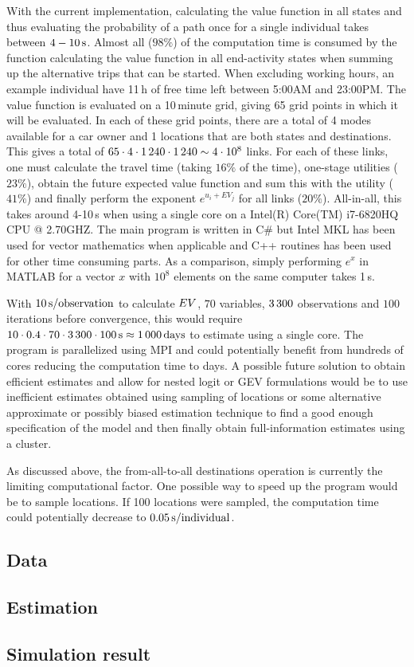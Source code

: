 With the current implementation, calculating the value function in all states and thus evaluating the probability of a path once for a single individual takes between $4-10\, \mathrm{s}$. Almost all ($98\%$) of the computation time is consumed by the function calculating the value function in all end-activity states when summing up the alternative trips that can be started. When excluding working hours, an example individual have 11\,h of free time left between 5:00AM and 23:00PM. The value function is evaluated on a 10\,minute grid, giving 65 grid points in which it will be evaluated. In each of these grid points, there are a total of 4 modes available for a car owner and 1 locations that are both states and destinations. This gives a total of $65 \cdot 4 \cdot 1\, 240 \cdot 1\, 240 \sim 4 \cdot 10^8$ links. For each of these links, one must calculate the travel time (taking $16\%$ of the time), one-stage utilities ($23\%$), obtain the future expected value function and sum this with the utility ($41\%$) and finally perform the exponent $e^{u_i + EV_j}$ for all links ($20\%$). All-in-all, this takes around 4-10\,s when using a single core on a Intel(R) Core(TM) i7-6820HQ CPU @ 2.70GHZ. The main program is written in C\# but Intel MKL has been used for vector mathematics when applicable and C++ routines has been used for other time consuming parts. As a comparison, simply performing $e^x$ in MATLAB for a vector $x$ with $10^8$ elements on the same computer takes 1\,s. 

With $10\, \mathrm{s/observation}$ to calculate $EV$, $70$ variables, $3\, 300$ observations and $100$ iterations before convergence, this would require $10 \cdot 0.4 \cdot  70 \cdot 3\, 300 \cdot 100 \, \mathrm{s} \approx 1\, 000 \, \mathrm{days}$ to estimate using a single core.
The program is parallelized using MPI and could potentially benefit from hundreds of cores reducing the computation time to days. A possible future solution to obtain efficient estimates and allow for nested logit or GEV formulations would be to use inefficient estimates obtained using sampling of locations or some alternative approximate or possibly biased estimation technique to find a good enough specification of the model and then finally obtain full-information estimates using a cluster. 

 As discussed above, the from-all-to-all destinations operation is currently the limiting computational factor. One possible way to speed up the program would be to sample locations. If 100 locations were sampled, the computation time could potentially decrease to $0.05\, \mathrm{s/individual}$.  


\subsection{Data}


\subsection{Estimation}



\subsection{Simulation result}



